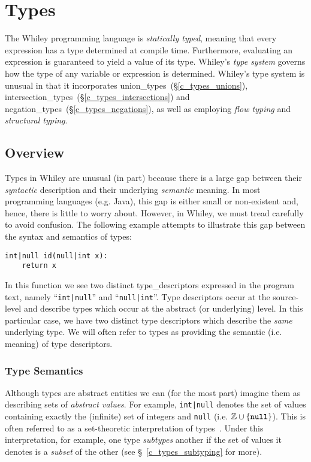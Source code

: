 \chapter{Types}
The Whiley programming language is {\em statically typed}, meaning that every expression has a type determined at compile time.  Furthermore, evaluating an expression is guaranteed to yield a value of its type.  Whiley's {\em type system} governs how the type of any variable or expression is determined.  Whiley's type system is unusual in that it incorporates \gls{union_type}s~(\S\ref{c_types_unions}), \gls{intersection_type}s~(\S\ref{c_types_intersections}) and \gls{negation_type}s~(\S\ref{c_types_negations}), as well as employing {\em flow typing} and {\em structural typing}.

\section{Overview}
\label{c_types_type_overview}

Types in Whiley are unusual (in part) because there is a large gap between their {\em syntactic} description and their underlying {\em semantic} meaning.  In most programming languages (e.g. Java), this gap is either small or non-existent and, hence, there is little to worry about.  However, in Whiley, we must tread carefully to avoid confusion.  The following example attempts to illustrate this gap between the syntax and semantics of types:
\begin{lstlisting}
int|null id(null|int x):
    return x
\end{lstlisting}
In this function we see two distinct \gls{type_descriptor}s expressed in the program text, namely ``\lstinline{int|null}'' and ``\lstinline{null|int}''.  Type descriptors occur at the source-level and describe \gls{type}s which occur at the abstract (or underlying) level.  In this particular case, we have two distinct type descriptors which describe the {\em same} underlying type.  We will often refer to types as providing the semantic (i.e. meaning) of type descriptors.  

\subsection{Type Semantics}
\label{c_types_type_semantics}

Although types are abstract entities we can (for the most part) imagine them as describing sets of {\em abstract values}.  For example, \lstinline{int|null} denotes the set of values containing exactly the (infinite) set of integers and \lstinline{null} (i.e. ${\tt\mathbb{Z}\cup\{null\}}$).  This is often referred to as a set-theoretic interpretation of types~\cite{AW93,Damm94,CF05,FCB08}.  Under this interpretation, for example, one type {\em subtypes}  another if the set of values it denotes is a {\em subset} of the other (see \S~\ref{c_types_subtyping} for more).  

